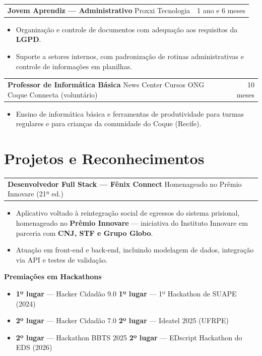 \documentclass[a4paper,10.5pt]{article}
\makeatletter
\newcommand{\cargo}[3]{%
  \vspace{2pt}
  \begin{tabularx}{\textwidth}{@{}Xr@{}}
    \textbf{#1} \textnormal{\textbar{} #2} & \textcolor{muted}{#3}
  \end{tabularx}%
  \vspace{1pt}
}
\makeatother
\begin{document}
\cargo{Jovem Aprendiz --- Administrativo}{Proxxi Tecnologia}{1 ano e 6 meses}
\begin{itemize}
  \item Organização e controle de documentos com adequação aos requisitos da \textbf{LGPD}.
  \item Suporte a setores internos, com padronização de rotinas administrativas e controle de informações em planilhas.
\end{itemize}

\cargo{Professor de Informática Básica}{News Center Cursos \textbar{} ONG Coque Connecta (voluntário)}{10 meses}
\begin{itemize}
  \item Ensino de informática básica e ferramentas de produtividade para turmas regulares e para crianças da comunidade do Coque (Recife).
\end{itemize}

\section{Projetos e Reconhecimentos}

\cargo{Desenvolvedor Full Stack --- Fênix Connect}{Homenageado no Prêmio Innovare (21ª ed.)}{}
\begin{itemize}
  \item Aplicativo voltado à reintegração social de egressos do sistema prisional, homenageado no \textbf{Prêmio Innovare} --- iniciativa do Instituto Innovare em parceria com \textbf{CNJ, STF e Grupo Globo}.
  \item Atuação em front-end e back-end, incluindo modelagem de dados, integração via API e testes de validação.
\end{itemize}

\textbf{Premiações em Hackathons}
\begin{itemize}
  \item \textbf{1º lugar} --- Hacker Cidadão 9.0 \textbar{} \textbf{1º lugar} --- 1º Hackathon de SUAPE (2024)
  \item \textbf{2º lugar} --- Hacker Cidadão 7.0 \textbar{} \textbf{2º lugar} --- Ideatel 2025 (UFRPE)
  \item \textbf{2º lugar} --- Hackathon BBTS 2025 \textbar{} \textbf{2º lugar} --- EDscript Hackathon do EDS (2026)
\end{itemize}
\end{document}
